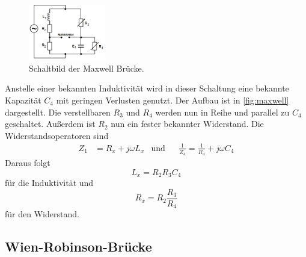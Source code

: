 \begin{figure}[H]
    \centering
    \includegraphics[width=0.3\textwidth]{build/maxwell.PNG}
    \caption{Schaltbild der Maxwell Brücke.\cite[222]{V302}}
    \label{fig:maxwell}
\end{figure}
Anstelle einer bekannten Induktivität wird in dieser Schaltung eine bekannte Kapazität $C_4$ mit geringen Verlusten genutzt.
Der Aufbau ist in \autoref{fig:maxwell} dargestellt.
Die verstellbaren $R_3$ und $R_4$ werden nun in Reihe und parallel zu $C_4$ geschaltet.
Außerdem ist $R_2$ nun ein fester bekannter Widerstand.
Die Widerstandsoperatoren sind
\begin{align}
    Z_1 &= R_x + j\omega L_x & \text{und}&  &\frac{1}{Z_4}=\frac{1}{R_4}+j\omega C_4
    \label{eqn:widerop_max}
\end{align}
Daraus folgt
\begin{equation}
    L_x = R_2 R_3 C_4
    \label{eqn:induktivität_max}
\end{equation}
für die Induktivität und 
\begin{equation}
    R_x = R_2 \frac{R_3}{R_4}
    \label{eqn:widerstand_max}
\end{equation}
für den Widerstand.
\subsection{Wien-Robinson-Brücke}
\label{subsec:wien-robinson}

